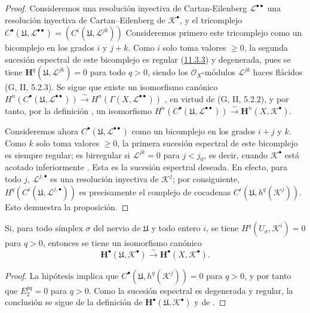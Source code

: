 \begin{proof}
Consideremos una resolución inyectiva de Cartan-Eilenberg $\mathcal L^{\bullet\bullet}$ una resolución inyectiva de
Cartan--Eilenberg de $\mathcal K^\bullet$, y el tricomplejo $C^\bullet(\mathfrak U,\mathcal L^{\bullet\bullet})
=(C^i(\mathfrak U,\mathcal L^{jk}))$
Consideremos primero este tricomplejo como un bicomplejo en los grados $i$ y
$j+k$.
Como $i$ solo toma valores $\geq0$, la segunda sucesión espectral de este bicomplejo es regular (\hyperref[0.11.3.3-fr]{11.3.3}) y degenerada, pues se tiene $\mathbf H^q(\mathfrak U,\mathcal L^{jk})=0$ para todo $q>0$, siendo los $\mathcal O_X$-módulos $\mathcal L^{jk}$ haces flácidos
(G, II, 5.2.3).
Se sigue que existe un isomorfismo canónico
$H^n(C^\bullet(\mathfrak U,\mathcal L^{\bullet\bullet}))\xrightarrow{\sim}H^n(\Gamma(X,\mathcal L^{\bullet\bullet}))$
, en virtud de (G, II, 5.2.2), y por tanto, por la
definición , un isomorfismo
$H^n(C^\bullet(\mathfrak U,\mathcal L^{\bullet\bullet}))\xrightarrow{\sim}\mathbf H^n(X,\mathcal K^\bullet)$.

Consideremos ahora
$C^\bullet(\mathfrak U,\mathcal L^{\bullet\bullet})$
como un bicomplejo en los grados $i+j$ y $k$.
Como $k$ solo toma valores $\geq0$, la primera sucesión espectral de este bicomplejo es siempre regular; es birregular si $\mathcal L^{jk}=0$ para $j<j_0$, es decir, cuando
$\mathcal K^\bullet$ está acotado inferiormente .
Esta es la sucesión espectral deseada.
En efecto, para todo $j$, $\mathcal L^{j,\bullet}$ es una resolución
inyectiva de $\mathcal K^j$; por consiguiente,
$H^q(C^i(\mathfrak U,\mathcal L^{j,\bullet}))$
es precisamente el complejo de cocadenas
$C^i(\mathfrak U,h^q(\mathcal K^j))$.
Esto demuestra la proposición.
\end{proof}

\begin{corollary}[12.4.7]
\label{0.12.4.7}
\label{0.12.4.7-fr}
Si, para todo símplex $\sigma$ del nervio de $\mathfrak U$ y
todo entero $i$, se tiene $H^q(U_\sigma,\mathcal K^i)=0$ para $q>0$, entonces se tiene un isomorfismo canónico
\begin{equation}
\label{0.12.4.7.1-fr}
\tag{12.4.7.1}
\mathbf H^\bullet(\mathfrak U,\mathcal K^\bullet)
\xrightarrow{\sim}\mathbf H^\bullet(X,\mathcal K^\bullet).
\end{equation}
\end{corollary}

\begin{proof}
La hipótesis implica que
$C^\bullet(\mathfrak U,h^q(\mathcal K^j))=0$ para $q>0$, y por tanto que
$E_2^{pq}=0$ para $q>0$.
Como la sucesión espectral  es degenerada y
regular, la conclusión se sigue de la definición
 de
$\mathbf H^\bullet(\mathfrak U,\mathcal K^\bullet)$ y de
.
\end{proof}

